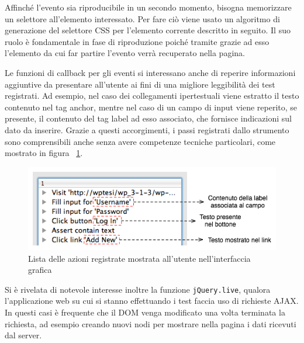 \documentclass[12pt]{toptesi}
\begin{document}


Affinché l'evento sia riproducibile in un secondo momento, bisogna memorizzare un selettore all'elemento interessato. Per fare ciò viene usato un algoritmo di generazione del selettore CSS per l'elemento corrente descritto in seguito. Il suo ruolo è fondamentale in fase di riproduzione poiché tramite grazie ad esso l'elemento da cui far partire l'evento verrà recuperato nella pagina. 

Le funzioni di callback per gli eventi si interessano anche di reperire informazioni aggiuntive da presentare all'utente ai fini di una migliore leggibilità dei test registrati. Ad esempio, nel caso dei collegamenti ipertestuali viene estratto il testo contenuto nel tag anchor, mentre nel caso di un campo di input viene reperito, se presente, il contenuto del tag label ad esso associato, che fornisce indicazioni sul dato da inserire. Grazie a questi accorgimenti, i passi registrati dallo strumento sono comprensibili anche senza avere competenze tecniche particolari, come mostrato in figura ~\ref{fig:actionNotes}.

\begin{figure}[htbp]
\begin{center}
\includegraphics[width=\textwidth]{images/action_notes.png}
\caption{Lista delle azioni registrate mostrata all'utente nell'interfaccia grafica}
\label{fig:actionNotes}
\end{center}
\end{figure}

Si è rivelata di notevole interesse inoltre la funzione \verb|jQuery.live|, qualora l'applicazione web su cui si stanno effettuando i test faccia uso di richieste AJAX. In questi casi è frequente che il DOM venga modificato una volta terminata la richiesta, ad esempio creando nuovi nodi per mostrare nella pagina i dati ricevuti dal server. 
\end{document}
